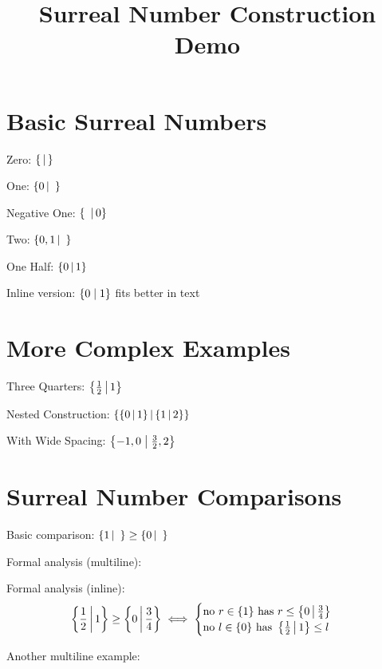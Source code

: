 \documentclass{article}
\begin{document}
\title{Surreal Number Construction Demo}
\maketitle

\section{Basic Surreal Numbers}

\noindent Zero: $\left\{\,\middle|\,\right\}$

\noindent One: $\left\{0 \,\middle|\, \ \right\}$

\noindent Negative One: $\left\{\  \,\middle|\, 0\right\}$

\noindent Two: $\left\{0,1 \,\middle|\, \ \right\}$

\noindent One Half: $\left\{0 \,\middle|\, 1\right\}$

\noindent Inline version: $\{0 \mid 1\}$ fits better in text

\section{More Complex Examples}

\noindent Three Quarters: $\left\{\frac{1}{2} \,\middle|\, 1\right\}$

\noindent Nested Construction: $\left\{\left\{0 \,\middle|\, 1\right\} \,\middle|\, \left\{1 \,\middle|\, 2\right\}\right\}$

\noindent With Wide Spacing: $\left\{ -1, 0 \;\middle|\; \frac{3}{2}, 2 \right\}$

\section{Surreal Number Comparisons}

\noindent Basic comparison: $\left\{1 \,\middle|\, \  \right\} \geq \left\{0 \,\middle|\, \  \right\}$

\noindent Formal analysis (multiline):

\noindent Formal analysis (inline):
$$\left\{\frac{1}{2} \,\middle|\, 1\right\} \geq \left\{0 \,\middle|\, \frac{3}{4}\right\} \iff \begin{cases} \text{no } r \in \{1\} \text{ has } r \leq \left\{0 \,\middle|\, \frac{3}{4}\right\} \\ \text{no } l \in \{0\} \text{ has } \left\{\frac{1}{2} \,\middle|\, 1\right\} \leq l \end{cases}$$

\noindent Another multiline example:
\end{document}
